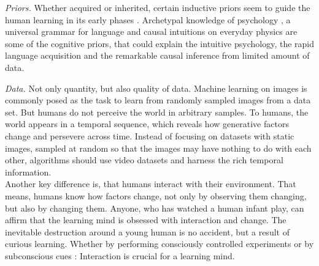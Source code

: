 	\emph{Priors.}
		Whether acquired or inherited, certain inductive priors seem to guide the human learning in its early phases \cite{tenenbaum18think}.
		Archetypal knowledge of psychology \cite{jung68archetype}, a universal grammar for language \cite{chomsky00horizons} and causal intuitions on everyday physics \cite{teglas11intuitive} are some of the cognitive priors, that could explain the intuitive psychology, the rapid language acquisition and the remarkable causal inference from limited amount of data.

	\emph{Data.}
		Not only quantity, but also quality of data. Machine learning on images is commonly posed as the task to learn from randomly sampled images from a data set. But humans do not perceive the world in arbitrary samples.
		To humans, the world appears in a temporal sequence, which reveals how generative factors change and persevere across time. Instead of focusing on datasets with static images, sampled at random so that the images may have nothing to do with each other, algorithms should use video datasets and harness the rich temporal information.\\
		Another key difference is, that humans interact with their environment.
		That means, humans know how factors change, not only by observing them changing, but also by changing them.
		Anyone, who has watched a human infant play, can affirm that the learning mind is obsessed with interaction and change. The inevitable destruction around a young human is no accident, but a result of curious learning.
		Whether by performing consciously controlled experiments or by subconscious cues \cite{wall08egomotion}: Interaction is crucial for a learning mind.


